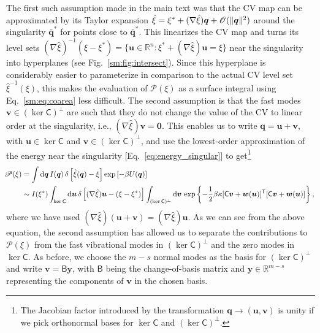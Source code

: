 The first such assumption made in the main text was that the CV map can be approximated by its Taylor expansion $\hat{\xi} = \xi^{*} + (\nabla\hat{\xi})\bm{q} + \mathscr{O}(\lVert\bm{q}\rVert^2)$ around the singularity $\bar{\bm{q}}^{*}$ for points close to $\bar{\bm{q}}^{*}$.
This linearizes the CV map and turns its level sets $(\nabla\hat{\xi})^{-1}(\xi - \xi^{*}) = \{\bm{u} \in \mathbb{R}^{n}: \xi^{*} + (\nabla\hat{\xi})\bm{u} = \xi\}$ near the singularity into hyperplanes (see Fig.~\ref{sm:fig:intersect}).
Since this hyperplane is considerably easier to parameterize in comparison to the actual CV level set $\hat{\xi}^{-1}(\xi)$, this makes the evaluation of $\mathscr{P}(\xi)$ as a surface integral using Eq.~\eqref{sm:eq:coarea} less difficult.
The second assumption is that the fast modes $\bm{v} \in (\ker\mathsf{C})^{\perp}$ are such that they do not change the value of the CV to linear order at the singularity, i.e., $(\nabla\hat{\xi})\bm{v} = \bm{0}$.
This enables us to write $\bm{q} = \bm{u} + \bm{v}$, with $\bm{u} \in \ker\mathsf{C}$ and $\bm{v} \in (\ker\mathsf{C})^\perp$, and use the lowest-order approximation of the energy near the singularity [Eq.~\eqref{eq:energy_singular}] to get\footnote{The Jacobian factor introduced by the transformation $\bm{q} \to (\bm{u}, \bm{v})$ is unity if we pick orthonormal bases for $\ker\mathsf{C}$ and $(\ker\mathsf{C})^{\perp}$.}
%
\begin{equation}
  \hspace{-0.5em}
  \begin{aligned}
    \mathscr{P}(\xi) &= \int \mathrm{d}\bm{q}\, I(\bm{q})\,\delta\left[\hat{\xi}(\bm{q}) - \xi\right] \exp\left[-\beta U(\bm{q})\right]\\
                                 &\sim I(\xi^{*}) \int_{\ker\mathsf{C}} \mathrm{d}\bm{u}\, \delta\left[(\nabla\hat{\xi})\bm{u} - (\xi - \xi^{*})\right] \int_{(\ker\mathsf{C})^{\perp}} \mathrm{d}\bm{v}\,  \exp\left\{-\frac{1}{2}\beta\kappa[\mathsf{C}\bm{v} + \bm{w}(\bm{u})]^\mathsf{T}[\mathsf{C}\bm{v} + \bm{w}(\bm{u})]\right\},
  \end{aligned}
\end{equation}
%
where we have used $(\nabla\hat{\xi})(\bm{u} + \bm{v}) = (\nabla\hat{\xi})\bm{u}$.
As we can see from the above equation, the second assumption has allowed us to separate the contributions to $\mathscr{P}(\xi)$ from the fast vibrational modes in $(\ker\mathsf{C})^{\perp}$ and the zero modes in $\ker\mathsf{C}$.
As before, we choose the $m - s$ normal modes as the basis for $(\ker\mathsf{C})^{\perp}$ and write $\bm{v} = \mathsf{B}\bm{y}$, with $\mathsf{B}$ being the change-of-basis matrix and $\bm{y} \in \mathbb{R}^{m-s}$ representing the components of $\bm{v}$ in the chosen basis.
